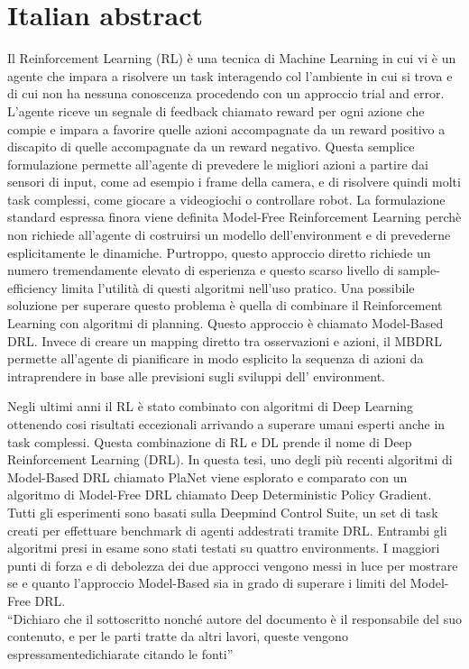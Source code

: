 \chapter*{Italian abstract}

Il Reinforcement Learning (RL) è una tecnica di Machine Learning in cui vi è un agente che impara a risolvere un task interagendo col l’ambiente in cui si trova e di cui non ha nessuna conoscenza procedendo con un approccio trial and error. L’agente riceve un segnale di feedback chiamato reward per ogni azione che compie e impara a favorire quelle azioni accompagnate da un reward positivo a discapito di quelle accompagnate da un reward negativo. 
Questa semplice formulazione permette all’agente di prevedere le migliori azioni a partire dai sensori di input, come ad esempio i frame della camera, e di risolvere quindi molti task complessi, come giocare a videogiochi o controllare robot.
La formulazione standard espressa finora viene definita Model-Free Reinforcement Learning perchè non richiede all'agente di costruirsi un modello dell'environment e di prevederne esplicitamente le dinamiche.
Purtroppo, questo approccio diretto richiede un numero tremendamente elevato di esperienza e questo scarso livello di sample-efficiency limita l’utilità di questi algoritmi nell’uso pratico.
Una possibile soluzione per superare questo problema è quella di combinare il Reinforcement Learning con algoritmi di planning.
Questo approccio è chiamato Model-Based DRL.
Invece di creare un mapping diretto tra osservazioni e azioni, il MBDRL permette all'agente di pianificare in modo esplicito la sequenza di azioni da intraprendere in base alle previsioni sugli sviluppi dell’ environment.

Negli ultimi anni il RL è stato combinato con algoritmi di Deep Learning ottenendo cosi risultati eccezionali arrivando a superare umani esperti anche in task complessi.
Questa combinazione di RL e DL prende il nome di Deep Reinforcement Learning (DRL).
In questa tesi, uno degli più recenti algoritmi di Model-Based DRL chiamato PlaNet viene esplorato e comparato con un algoritmo di Model-Free DRL chiamato Deep Deterministic Policy Gradient.
Tutti gli esperimenti sono basati sulla Deepmind Control Suite, un set di task creati per effettuare benchmark di agenti addestrati tramite DRL. Entrambi gli algoritmi presi in esame sono stati testati su quattro environments.
I maggiori punti di forza e di debolezza dei due approcci vengono messi in luce per mostrare se e quanto l’approccio Model-Based sia in grado di superare i limiti del Model-Free DRL.\\

“Dichiaro che il sottoscritto nonché autore del documento è il responsabile del suo contenuto, e per le parti tratte da altri lavori, queste vengono espressamentedichiarate citando le fonti”

